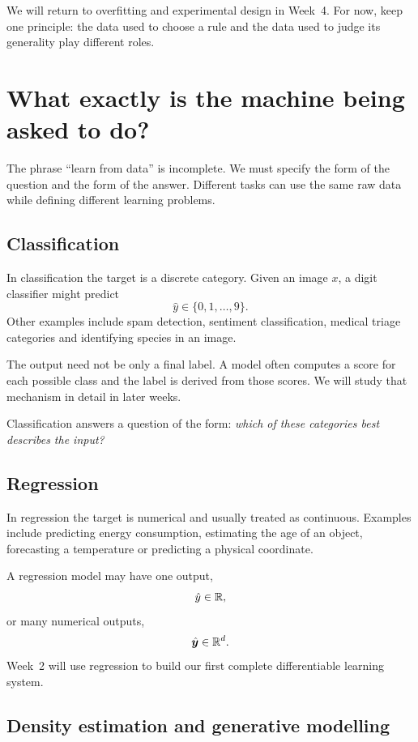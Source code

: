 We will return to overfitting and experimental design in Week~4. For now, keep one principle: the data used to choose a rule and the data used to judge its generality play different roles.

\section{What exactly is the machine being asked to do?}

The phrase ``learn from data'' is incomplete. We must specify the form of the question and the form of the answer. Different tasks can use the same raw data while defining different learning problems.

\subsection{Classification}

In classification the target is a discrete category. Given an image \(x\), a digit classifier might predict
\[
  \hat{y} \in \{0,1,\ldots,9\}.
\]
Other examples include spam detection, sentiment classification, medical triage categories and identifying species in an image.

The output need not be only a final label. A model often computes a score for each possible class and the label is derived from those scores. We will study that mechanism in detail in later weeks.

Classification answers a question of the form: \emph{which of these categories best describes the input?}

\subsection{Regression}

In regression the target is numerical and usually treated as continuous. Examples include predicting energy consumption, estimating the age of an object, forecasting a temperature or predicting a physical coordinate.

A regression model may have one output,
\[
  \hat{y} \in \mathbb{R},
\]
or many numerical outputs,
\[
  \hat{\bm{y}} \in \mathbb{R}^d.
\]
Week~2 will use regression to build our first complete differentiable learning system.

\subsection{Density estimation and generative modelling}

